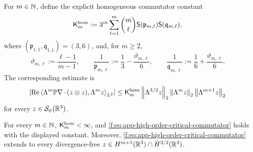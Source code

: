 For \(m\in\mathbb N\), define the explicit homogeneous commutator constant
\begin{equation}
 \mathsf K_m^{\rm hom}:=
 3^m\sum_{\ell=1}^m\binom m\ell
 \mathsf S(\mathfrak p_{m,\ell})\mathsf S(\mathfrak q_{m,\ell}),
 \label{f:eq:app-explicit-homogeneous-commutator-constant}
\end{equation}
where \((\mathfrak p_{1,1},\mathfrak q_{1,1})=(3,6)\), and, for \(m\ge2\),
\[
 \vartheta_{m,\ell}:=\frac{\ell-1}{m-1},
 \qquad
 \frac1{\mathfrak p_{m,\ell}}:=\frac13-\frac{\vartheta_{m,\ell}}6,
 \qquad
 \frac1{\mathfrak q_{m,\ell}}:=\frac16+\frac{\vartheta_{m,\ell}}6.
\]
The corresponding estimate is
\begin{equation}
 \left|\operatorname{Re}
 \left\langle \Lambda^m\mathbb P\nabla\!\cdot(z\otimes z),\Lambda^mz\right\rangle_{L^2}\right|
 \le
 \mathsf K_m^{\rm hom}
 \left\lVert \Lambda^{3/2}z\right\rVert_2
 \left\lVert \Lambda^mz\right\rVert_2
 \left\lVert \Lambda^{m+1}z\right\rVert_2
 \label{f:eq:app-high-order-critical-commutator}
\end{equation}
for every \(z\in\mathcal S_\sigma(\mathbb R^3)\).

\begin{lemma}
\label{f:lem:app-critical-commutator}
For every \(m\in\mathbb N\), \(\mathsf K_m^{\rm hom}<\infty\), and
\eqref{f:eq:app-high-order-critical-commutator} holds with the displayed
constant.
Moreover, \eqref{f:eq:app-high-order-critical-commutator} extends to every
divergence-free
\(z\in H^{m+1}(\mathbb R^3)\cap\dot H^{3/2}(\mathbb R^3)\).
\end{lemma}

